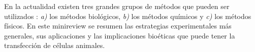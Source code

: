 \documentclass[fleqn,10pt]{SelfArx} %
\begin{document}
En la actualidad existen tres grandes grupos de métodos que pueden ser utilizados \cite{Kim:2010aa}: \textit{a)} los métodos biológicos, \textit{b)} los métodos químicos y \textit{c)} los métodos físicos. En este minireview se resumen las estrategias experimentales más generales, sus aplicaciones y las implicaciones bioéticas que puede tener la transfección de células animales.

\end{document}
